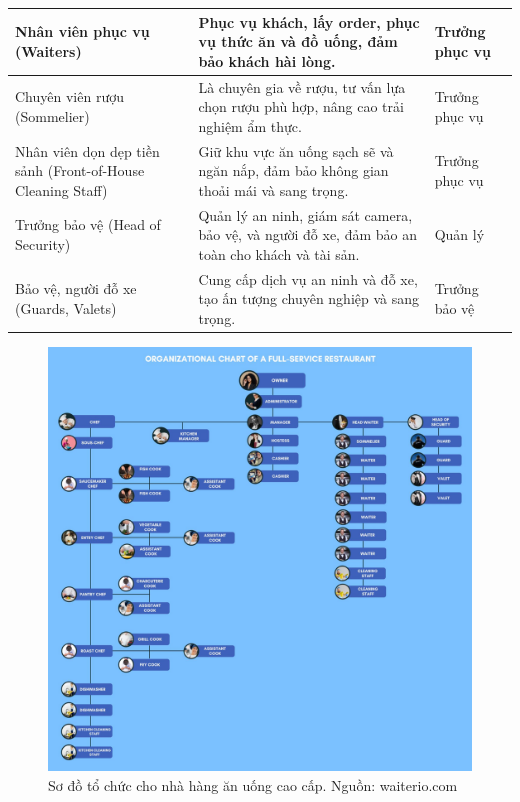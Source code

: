 \begin{longtable}{| p{4cm} | p{8cm} | p{3cm} |}
	\hline
	Nhân viên phục vụ (Waiters)                                                       & Phục vụ khách, lấy order, phục vụ thức ăn và đồ uống, đảm bảo khách hài lòng.                                                                   & Trưởng phục vụ          \\
	\hline
	Chuyên viên rượu (Sommelier)                                                      & Là chuyên gia về rượu, tư vấn lựa chọn rượu phù hợp, nâng cao trải nghiệm ẩm thực.                                                              & Trưởng phục vụ          \\
	\hline
	Nhân viên dọn dẹp tiền sảnh (Front-of-House Cleaning Staff)                       & Giữ khu vực ăn uống sạch sẽ và ngăn nắp, đảm bảo không gian thoải mái và sang trọng.                                                            & Trưởng phục vụ          \\
	\hline
	Trưởng bảo vệ (Head of Security)                                                  & Quản lý an ninh, giám sát camera, bảo vệ, và người đỗ xe, đảm bảo an toàn cho khách và tài sản.                                                 & Quản lý                 \\
	\hline
	Bảo vệ, người đỗ xe (Guards, Valets)                                              & Cung cấp dịch vụ an ninh và đỗ xe, tạo ấn tượng chuyên nghiệp và sang trọng.                                                                    & Trưởng bảo vệ           \\
	\hline
\end{longtable}



\begin{figure}[H]
	\centering
	\includegraphics[width=15cm]{Images/finedining_orig_chart.jpg}
	\vspace{0.5cm}
	\caption{Sơ đồ tổ chức cho nhà hàng ăn uống cao cấp. Nguồn: waiterio.com}
\end{figure}

